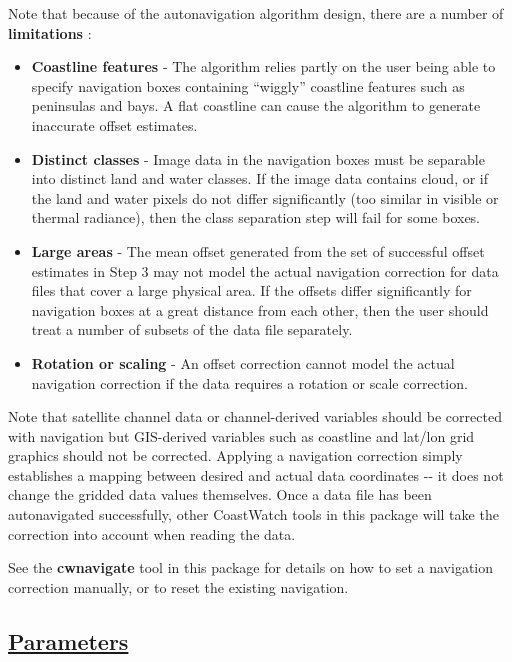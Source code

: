  Note that because of the autonavigation algorithm design, there are a number of \textbf{limitations}
:
\begin{itemize}
\item \textbf{Coastline features}
 - The algorithm relies partly on the user being able to specify navigation boxes containing ``wiggly'' coastline features such as peninsulas and bays. A flat coastline can cause the algorithm to generate inaccurate offset estimates.
\item \textbf{Distinct classes}
 - Image data in the navigation boxes must be separable into distinct land and water classes. If the image data contains cloud, or if the land and water pixels do not differ significantly (too similar in visible or thermal radiance), then the class separation step will fail for some boxes.
\item \textbf{Large areas}
 - The mean offset generated from the set of successful offset estimates in Step 3 may not model the actual navigation correction for data files that cover a large physical area. If the offsets differ significantly for navigation boxes at a great distance from each other, then the user should treat a number of subsets of the data file separately.
\item \textbf{Rotation or scaling}
 - An offset correction cannot model the actual navigation correction if the data requires a rotation or scale correction.

\end{itemize}


 Note that satellite channel data or channel-derived variables should be corrected with navigation but GIS-derived variables such as coastline and lat/lon grid graphics should not be corrected. Applying a navigation correction simply establishes a mapping between desired and actual data coordinates -{-} it does not change the gridded data values themselves. Once a data file has been autonavigated successfully, other CoastWatch tools in this package will take the correction into account when reading the data.


 See the \textbf{cwnavigate}
 tool in this package for details on how to set a navigation correction manually, or to reset the existing navigation.
\subsection*{\underline{Parameters}}
